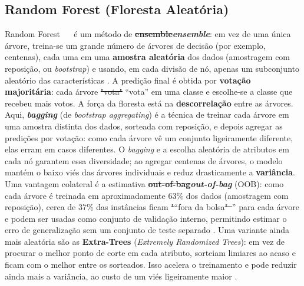 \documentclass[msc]{on} %
\makeatletter
\providecommand{\DIFaddtex}[1]{{\protect\color{red}#1}} %
\providecommand{\DIFdeltex}[1]{{\protect\color{red}\sout{#1}}} %
\providecommand{\DIFaddbegin}{} %
\providecommand{\DIFaddend}{} %
\providecommand{\DIFdelbegin}{} %
\providecommand{\DIFdelend}{} %
\providecommand{\DIFadd}[1]{\texorpdfstring{\DIFaddtex{#1}}{#1}} %
\providecommand{\DIFdel}[1]{\texorpdfstring{\DIFdeltex{#1}}{}} %
\let\sout@orig\sout %
\renewcommand{\sout}[1]{\ifmmode\text{\sout@orig{\ensuremath{#1}}}\else\sout@orig{#1}\fi} %
\makeatother
\begin{document}
\subsection{Random Forest (Floresta Aleatória)}

Random Forest \DIFaddbegin \DIFadd{\mbox{%
\citep{Breiman2001} }\hskip0pt%
}\DIFaddend é um método de \textbf{\DIFdelbegin \DIFdel{ensemble}\DIFdelend \DIFaddbegin \textit{\DIFadd{ensemble}}\DIFaddend }: em vez de uma única árvore, treina-se um grande número de árvores de decisão (por exemplo, centenas), cada uma em uma \textbf{amostra aleatória} dos dados (amostragem com reposição, ou \textit{bootstrap}) e usando, em cada divisão de nó, apenas um subconjunto aleatório das características \citep{geron2019maos, Levada2026}. A predição final é obtida por \textbf{votação majoritária}: cada árvore \DIFdelbegin \DIFdel{"vota" }\DIFdelend \DIFaddbegin \DIFadd{``vota'' }\DIFaddend em uma classe e escolhe-se a classe que recebeu mais votos. A força da floresta está na \textbf{descorrelação} entre as árvores. Aqui, \textbf{\textit{bagging}} (de \textit{bootstrap aggregating}) é a técnica de treinar cada árvore em uma amostra distinta dos dados, sorteada com reposição, e depois agregar as predições por votação: como cada árvore vê um conjunto ligeiramente diferente, elas erram em casos diferentes. O \textit{bagging} e a escolha aleatória de atributos em cada nó garantem essa diversidade; ao agregar centenas de árvores, o modelo mantém o baixo viés das árvores individuais e reduz drasticamente a \textbf{variância}. Uma vantagem colateral é a estimativa \textbf{\DIFdelbegin \DIFdel{out-of-bag}\DIFdelend \DIFaddbegin \textit{\DIFadd{out-of-bag}}\DIFaddend } (OOB): como cada árvore é treinada em aproximadamente 63\% dos dados (amostragem com reposição), cerca de 37\% das instâncias ficam \DIFdelbegin \DIFdel{"}\DIFdelend \DIFaddbegin \DIFadd{``}\DIFaddend fora da bolsa\DIFdelbegin \DIFdel{"~}\DIFdelend \DIFaddbegin \DIFadd{'' }\DIFaddend para cada árvore e podem ser usadas como conjunto de validação interno, permitindo estimar o erro de generalização sem um conjunto de teste separado \citep{geron2019maos}. Uma variante ainda mais aleatória são as \textbf{Extra-Trees} (\textit{Extremely Randomized Trees}): em vez de procurar o melhor ponto de corte em cada atributo, sorteiam limiares ao acaso e ficam com o melhor entre os sorteados. Isso acelera o treinamento e pode reduzir ainda mais a variância, ao custo de um viés ligeiramente maior \citep{geron2019maos}.
\end{document}
